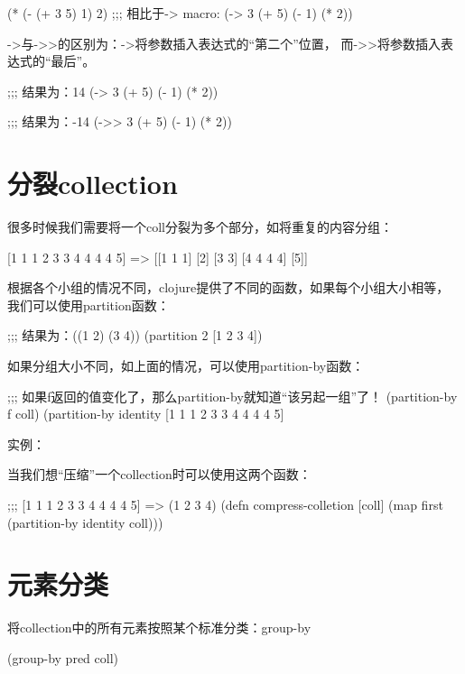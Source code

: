 ﻿\documentclass[a4paper,11pt]{article}
\begin{document}
  \begin{schemecode}
(* (- (+ 3 5) 1) 2)
;;; 相比于-> macro:
(-> 3 (+ 5) (- 1) (* 2))
  \end{schemecode}

  ->与->>的区别为：->将参数插入表达式的“第二个”位置，
  而->>将参数插入表达式的“最后”。

  \begin{schemecode}
;;; 结果为：14
(-> 3 (+ 5) (- 1) (* 2))

;;; 结果为：-14
(->> 3 (+ 5) (- 1) (* 2))
  \end{schemecode}


  \section[分裂collection]{分裂collection}
  很多时候我们需要将一个coll分裂为多个部分，如将重复的内容分组：

  [1 1 1 2 3 3 4 4 4 4 5] => [[1 1 1] [2] [3 3] [4 4 4 4] [5]]

  根据各个小组的情况不同，clojure提供了不同的函数，如果每个小组大小相等，
  我们可以使用partition函数：

  \begin{schemecode}
;;; 结果为：((1 2) (3 4))
(partition 2 [1 2 3 4])
  \end{schemecode}

  如果分组大小不同，如上面的情况，可以使用partition-by函数：

  \begin{schemecode}
;;; 如果f返回的值变化了，那么partition-by就知道“该另起一组”了！
(partition-by f coll)
(partition-by identity [1 1 1 2 3 3 4 4 4 4 5]
  \end{schemecode}

  实例：\par
  当我们想“压缩”一个collection时可以使用这两个函数：

  \begin{schemecode}
;;; [1 1 1 2 3 3 4 4 4 4 5] => (1 2 3 4)
(defn compress-colletion
  [coll]
  (map first (partition-by identity coll)))
  \end{schemecode}


  \section[元素分类]{元素分类}
  将collection中的所有元素按照某个标准分类：group-by

  \begin{schemecode}
(group-by pred coll)
  \end{schemecode}
\end{document}
